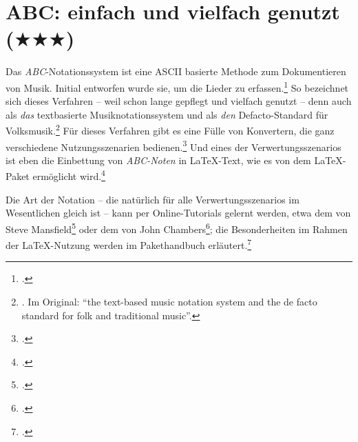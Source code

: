 %
%
%




\section{ABC: einfach und vielfach genutzt ($\bigstar\bigstar\bigstar$)}

Das \textit{ABC}-Notationssystem ist eine ASCII basierte Methode zum Dokumentieren
von Musik. Initial entworfen wurde sie, um die Lieder zu
erfassen.\footcite[vgl.][\nopage Subpage 'Intro']{Chambers2018a} So bezeichnet
sich dieses Verfahren -- weil schon lange gepflegt und vielfach genutzt -- denn
auch als \textit{das} textbasierte Musiknotationssystem und als \textit{den}
Defacto-Standard für Volksmusik.\footnote{\cite[vgl.][\nopage wp]{Abc2018a}. Im
Original: \enquote{the text-based music notation system and the de facto
standard for folk and traditional music}.} Für dieses Verfahren gibt es eine
Fülle von Konvertern, die ganz verschiedene Nutzungsszenarien
bedienen.\footcite[vgl.][\nopage wp]{Abc2018b} Und eines der
Verwertungsszenarios ist eben die Einbettung von \textit{ABC-Noten} in
\LaTeX-Text, wie es von dem \LaTeX-Paket ermöglicht
wird.\footcite[vgl.][\nopage wp]{CtanAbc2018a}

Die Art der Notation -- die natürlich für alle Verwertungsszenarios im
Wesentlichen gleich ist -- kann per Online-Tutorials gelernt werden, etwa dem
von Steve Mansfield\footcite[vgl.][\nopage wp]{Mansfield2016a} oder dem von
John Chambers\footcite[vgl.][\nopage wp]{Chambers2018a}; die Besonderheiten im
Rahmen der \LaTeX-Nutzung werden im Pakethandbuch
erläutert.\footcite[vgl.][\nopage wp]{Gregorio2016a}

